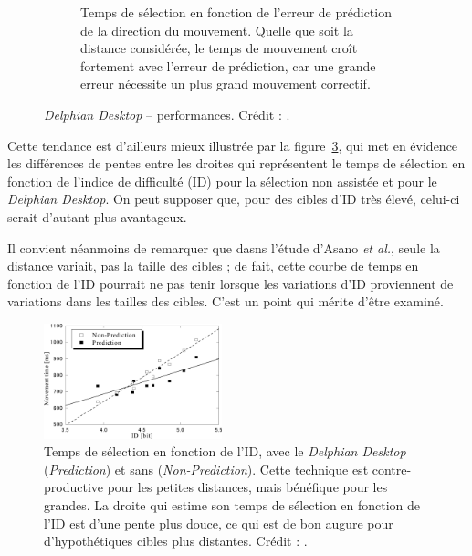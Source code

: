 \begin{figure}[!htb]
\begin{subfigure}[t]{0.49\textwidth}
			\caption{Temps de sélection en fonction de l'erreur de prédiction de la direction du mouvement. Quelle que soit la distance considérée, le temps de mouvement croît fortement avec l'erreur de prédiction, car une grande erreur nécessite un plus grand mouvement correctif.}
			\label{fig:delphianTimesErrors}
		\end{subfigure}
		\caption[\emph{Delphian Desktop} -- performances]{\emph{Delphian Desktop} -- performances. Crédit : \cite{asano2005predictive}.}
		\label{fig:delphianPerf}
	\end{figure}

	Cette tendance est d'ailleurs mieux illustrée par la figure~\ref{fig:delphianTimesID}, qui met en évidence les différences de pentes entre les droites qui représentent le temps de sélection en fonction de l'indice de difficulté (ID) pour la sélection non assistée et pour le \emph{Delphian Desktop}. On peut supposer que, pour des cibles d'ID très élevé, celui-ci serait d'autant plus avantageux.
	
	Il convient néanmoins de remarquer que dasns l'étude d'Asano \emph{et al.}, seule la distance variait, pas la taille des cibles ; de fait, cette courbe de temps en fonction de l'ID pourrait ne pas tenir lorsque les variations d'ID proviennent de variations dans les tailles des cibles. C'est un point qui mérite d'être examiné.

	\begin{figure} %
		\centering
		\includegraphics[width=0.46\textwidth]{figures/ch2/delphianTimesID}
		\caption[\emph{Delphian Desktop} -- temps de sélection en fonction de l'ID]{Temps de sélection en fonction de l'ID, avec le \emph{Delphian Desktop} (\emph{Prediction}) et sans (\emph{Non-Prediction}). Cette technique est contre-productive pour les petites distances, mais bénéfique pour les grandes. La droite qui estime son temps de sélection en fonction de l'ID est d'une pente plus douce, ce qui est de bon augure pour d'hypothétiques cibles plus distantes. Crédit : \cite{asano2005predictive}.}
		\label{fig:delphianTimesID}
	\end{figure}
	
